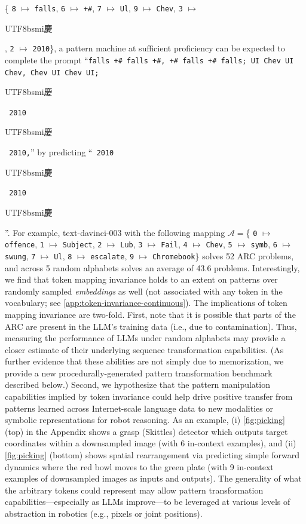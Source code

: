 \documentclass{article}
\renewcommand{\tt}[1]{{\texttt{#1}}}
\newcommand{\ch}{\begin{CJK*}{UTF8}{bsmi}慶\end{CJK*}}
\newcommand{\ie}{i.e., }
\newcommand{\eg}{e.g., }
\begin{document}
\{
\tt{8} $\mapsto$ \tt{falls},
\tt{6} $\mapsto$ \tt{+\#},
\tt{7} $\mapsto$ \tt{Ul},
\tt{9} $\mapsto$ \tt{Chev},
\tt{3} $\mapsto$ \ch,
\tt{2} $\mapsto$ \tt{2010}\},
a pattern machine at sufficient proficiency can be expected to complete the prompt
``\tt{falls +\# falls +\#, +\# falls +\# falls; UI Chev UI Chev, Chev UI Chev UI; }\ch\tt{ 2010 }\ch\tt{ 2010,}''
by predicting
``\tt{ 2010 }\ch\tt{ 2010 }\ch''.
For example, text-davinci-003 \cite{ouyang2022training,brown2020language} with the following mapping
$\mathcal{A}=$\{
\tt{0} $\mapsto$ \tt{offence},
\tt{1} $\mapsto$ \tt{Subject},
\tt{2} $\mapsto$ \tt{Lub},
\tt{3} $\mapsto$ \tt{Fail},
\tt{4} $\mapsto$ \tt{Chev},
\tt{5} $\mapsto$ \tt{symb},
\tt{6} $\mapsto$ \tt{swung},
\tt{7} $\mapsto$ \tt{Ul},
\tt{8} $\mapsto$ \tt{escalate},
\tt{9} $\mapsto$ \tt{Chromebook}\}
solves 52 ARC problems, and across 5 random alphabets solves an average of 43.6 problems. Interestingly, we find that token mapping invariance holds to an extent on patterns over randomly sampled \textit{embeddings} as well (not associated with any token in the vocabulary; see \cref{app:token-invariance-continuous}).
The implications of token mapping invariance are two-fold.
First, note that it is possible that parts of the ARC are present in the LLM's training data (\ie due to contamination).
Thus, measuring the performance of LLMs under random alphabets may provide a closer estimate of their underlying sequence transformation capabilities. (As further evidence that these abilities are not simply due to memorization, we provide a new procedurally-generated pattern transformation benchmark described below.)
Second, we hypothesize that the pattern manipulation capabilities implied by token invariance could help drive positive transfer from patterns learned across Internet-scale language data to new modalities or symbolic representations for robot reasoning.
As an example, (i) \cref{fig:picking} (top) in the Appendix shows a grasp (Skittles) detector which outputs target coordinates within a downsampled image (with 6 in-context examples), and (ii) \cref{fig:picking} (bottom) shows spatial rearrangement via predicting simple forward dynamics where the red bowl moves to the green plate (with 9 in-context examples of downsampled images as inputs and outputs).
The generality of what the arbitrary tokens could represent may allow pattern transformation capabilities---especially as LLMs improve---to be leveraged at various levels of abstraction in robotics (\eg pixels or joint positions).
\end{document}
